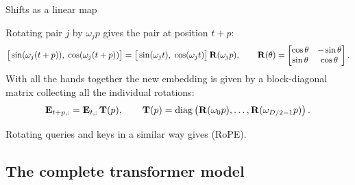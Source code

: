 \begin{frame}{Shifts as a linear map}
    \setlength{\parskip}{6pt}

    Rotating pair $j$ by $\omega_jp$ gives the pair at position $t+p$:
    \[
        \big[\sin(\omega_j(t+p)),\;\cos(\omega_j(t+p))\big]
        =\big[\sin(\omega_jt),\;\cos(\omega_jt)\big]\,\vc{R}(\omega_jp),
        \qquad
        \vc{R}(\theta)=\begin{bmatrix}\cos\theta&-\sin\theta\\\sin\theta&\cos\theta\end{bmatrix}.
    \]
    With all the hands together the new embedding is given by a block-diagonal matrix collecting all the individual rotations:
    \[
        \idx{\vc{E}}{t+p,:}=\idx{\vc{E}}{t,:}\,\eqnmarkbox[drawblue]{tp}{\vc{T}(p)},
        \qquad
        \vc{T}(p)=\operatorname{diag}\big(\vc{R}(\omega_0p),\ldots,\vc{R}(\omega_{D/2-1}p)\big) \,.
    \]
    \vspace{0.6em}

    Rotating queries and keys in a similar way gives
     (RoPE).

\end{frame}

\ifNNcourse

\fi

\subsection{The complete transformer model}

